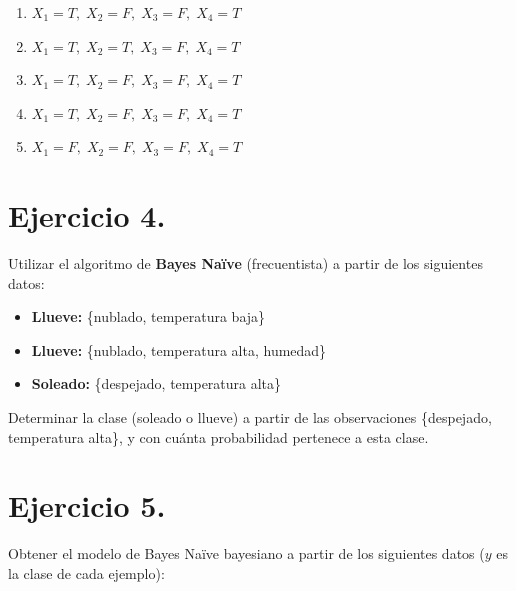 \documentclass[12pt,letterpaper]{article}
\begin{document}
\begin{enumerate}
  \item[\textit{a)}] $X_1 = T,\; X_2 = F,\; X_3 = F,\; X_4 = T$
  \item[\textit{b)}] $X_1 = T,\; X_2 = T,\; X_3 = F,\; X_4 = T$
  \item[\textit{c)}] $X_1 = T,\; X_2 = F,\; X_3 = F,\; X_4 = T$
  \item[\textit{d)}] $X_1 = T,\; X_2 = F,\; X_3 = F,\; X_4 = T$
  \item[\textit{e)}] $X_1 = F,\; X_2 = F,\; X_3 = F,\; X_4 = T$
\end{enumerate}

\bigskip



\newpage

\section{Ejercicio 4.}
Utilizar el algoritmo de \textbf{Bayes Naïve} (frecuentista) a partir de los siguientes datos:
 
\begin{itemize}
  \item \textbf{Llueve:} \{nublado, temperatura baja\}
  \item \textbf{Llueve:} \{nublado, temperatura alta, humedad\}
  \item \textbf{Soleado:} \{despejado, temperatura alta\}
\end{itemize}
 
Determinar la clase (soleado o llueve) a partir de las observaciones \{despejado, temperatura alta\},
y con cuánta probabilidad pertenece a esta clase.

\bigskip



\newpage

\section{Ejercicio 5.}
Obtener el modelo de Bayes Naïve bayesiano a partir de los siguientes datos ($y$ es la clase
de cada ejemplo):
 
\end{document}
